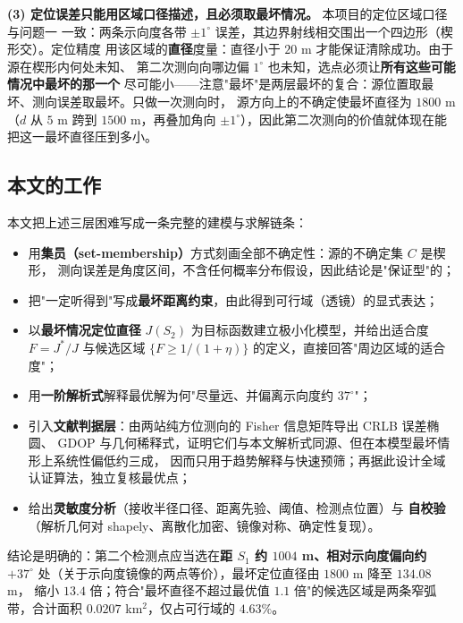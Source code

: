 \textbf{(3) 定位误差只能用区域口径描述，且必须取最坏情况。} 本项目的定位区域口径与问题一
一致：两条示向度各带 $\pm1^\circ$ 误差，其边界射线相交围出一个四边形（楔形交）。定位精度
用该区域的\textbf{直径}度量：直径小于 $20$ m 才能保证清除成功。由于源在楔形内何处未知、
第二次测向向哪边偏 $1^\circ$ 也未知，选点必须让\textbf{所有这些可能情况中最坏的那一个}
尽可能小——注意"最坏"是两层最坏的复合：源位置取最坏、测向误差取最坏。只做一次测向时，
源方向上的不确定使最坏直径为 $1800$ m（$d$ 从 $5$ m 跨到 $1500$ m，再叠加角向
$\pm1^\circ$），因此第二次测向的价值就体现在能把这一最坏直径压到多小。

\subsection{本文的工作}

本文把上述三层困难写成一条完整的建模与求解链条：

\begin{itemize}
  \item 用\textbf{集员（set-membership）}方式刻画全部不确定性：源的不确定集 $C$ 是楔形，
        测向误差是角度区间，不含任何概率分布假设，因此结论是"保证型"的；
  \item 把"一定听得到"写成\textbf{最坏距离约束}，由此得到可行域（透镜）的显式表达；
  \item 以\textbf{最坏情况定位直径} $J(S_2)$ 为目标函数建立极小化模型，并给出适合度
        $F=J^*/J$ 与候选区域 $\{F\ge1/(1+\eta)\}$ 的定义，直接回答"周边区域的适合度"；
  \item 用\textbf{一阶解析式}解释最优解为何"尽量远、并偏离示向度约 $37^\circ$"；
  \item 引入\textbf{文献判据层}：由两站纯方位测向的 Fisher 信息矩阵导出 CRLB 误差椭圆、
        GDOP 与几何稀释式，证明它们与本文解析式同源、但在本模型最坏情形上系统性偏低约三成，
        因而只用于趋势解释与快速预筛；再据此设计全域认证算法，独立复核最优点；
  \item 给出\textbf{灵敏度分析}（接收半径口径、距离先验、阈值、检测点位置）与
        \textbf{自校验}（解析几何对 shapely、离散化加密、镜像对称、确定性复现）。
\end{itemize}

结论是明确的：第二个检测点应当选在\textbf{距 $S_1$ 约 $1004$ m、相对示向度偏向约
$+37^\circ$} 处（关于示向度镜像的两点等价），最坏定位直径由 $1800$ m 降至 $134.08$ m，
缩小 $13.4$ 倍；符合"最坏直径不超过最优值 $1.1$ 倍"的候选区域是两条窄弧带，合计面积
$0.0207$ km$^2$，仅占可行域的 $4.63\%$。
